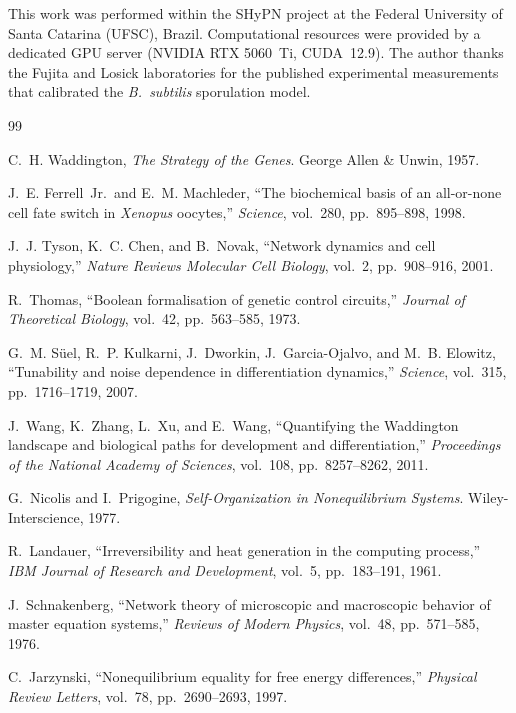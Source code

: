 \documentclass[11pt,a4paper]{article}
\begin{document}
This work was performed within the SHyPN project at the Federal University
of Santa Catarina (UFSC), Brazil.
Computational resources were provided by a dedicated GPU server
(NVIDIA RTX 5060~Ti, CUDA~12.9).
The author thanks the Fujita and Losick laboratories for the published
experimental measurements that calibrated the \textit{B.~subtilis}
sporulation model.

\begin{thebibliography}{99}

C.~H. Waddington,
\textit{The Strategy of the Genes}.
George Allen \& Unwin, 1957.

J.~E. Ferrell~Jr.\ and E.~M. Machleder,
``The biochemical basis of an all-or-none cell fate switch in
\textit{Xenopus} oocytes,''
\textit{Science}, vol.~280, pp.~895--898, 1998.

J.~J. Tyson, K.~C. Chen, and B.~Novak,
``Network dynamics and cell physiology,''
\textit{Nature Reviews Molecular Cell Biology}, vol.~2, pp.~908--916, 2001.

R.~Thomas,
``Boolean formalisation of genetic control circuits,''
\textit{Journal of Theoretical Biology}, vol.~42, pp.~563--585, 1973.

G.~M. S\"{u}el, R.~P. Kulkarni, J.~Dworkin, J.~Garcia-Ojalvo, and
M.~B. Elowitz,
``Tunability and noise dependence in differentiation dynamics,''
\textit{Science}, vol.~315, pp.~1716--1719, 2007.

J.~Wang, K.~Zhang, L.~Xu, and E.~Wang,
``Quantifying the Waddington landscape and biological paths for
development and differentiation,''
\textit{Proceedings of the National Academy of Sciences}, vol.~108,
pp.~8257--8262, 2011.

G.~Nicolis and I.~Prigogine,
\textit{Self-Organization in Nonequilibrium Systems}.
Wiley-Interscience, 1977.

R.~Landauer,
``Irreversibility and heat generation in the computing process,''
\textit{IBM Journal of Research and Development}, vol.~5, pp.~183--191, 1961.

J.~Schnakenberg,
``Network theory of microscopic and macroscopic behavior of master
equation systems,''
\textit{Reviews of Modern Physics}, vol.~48, pp.~571--585, 1976.

C.~Jarzynski,
``Nonequilibrium equality for free energy differences,''
\textit{Physical Review Letters}, vol.~78, pp.~2690--2693, 1997.


\end{thebibliography}
\end{document}
